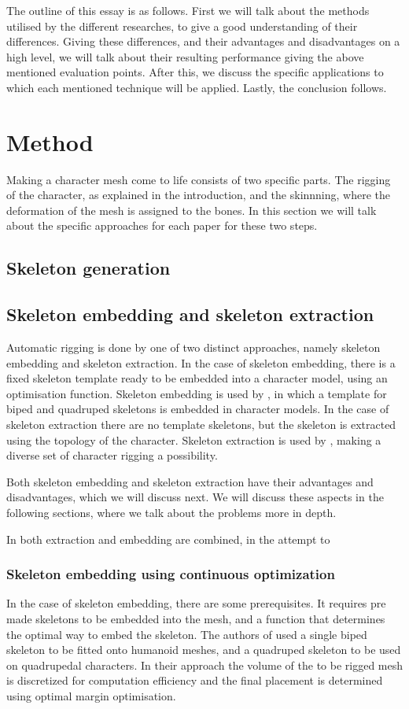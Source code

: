 \documentclass{article}
\begin{document}
The outline of this essay is as follows. First we will talk about the methods
utilised by the different researches, to give a good understanding of their
differences. Giving these differences, and their advantages and disadvantages on
a high level, we will talk about their resulting performance giving the above
mentioned evaluation points. After this, we discuss the specific applications to
which each mentioned technique will be applied. Lastly, the conclusion follows.

\section{Method}
Making a character mesh come to life consists of two specific parts. The rigging
of the character, as explained in the introduction, and the skinnning, where the
deformation of the mesh is assigned to the bones. In this section we will talk
about the specific approaches for each paper for these two steps.

\subsection{Skeleton generation}
    \subsection{Skeleton embedding and skeleton extraction}
Automatic rigging is done by one of two distinct approaches, namely skeleton
embedding and skeleton extraction. In the case of skeleton embedding, there
is a fixed skeleton template ready to be embedded into a character model,
using an optimisation function. Skeleton embedding is used by
\citep{paper1}, in which a template for biped and quadruped skeletons is
embedded in character     models. In the case of skeleton extraction there
are no template skeletons, but the skeleton is     extracted using the
topology of the character. Skeleton extraction is used by \citep{paper2},
making a diverse set of character rigging a possibility.

Both skeleton embedding and skeleton extraction have their advantages and
disadvantages, which     we will discuss next. We will discuss these aspects in
the following sections, where we talk     about the problems more in depth. 

In \citep{paper3} both extraction and embedding are combined, in the attempt to    

\subsubsection{Skeleton embedding using continuous optimization}
In the case of skeleton embedding, there are some prerequisites. It requires pre
made skeletons to be embedded into the mesh, and a function that determines the
optimal way to embed the skeleton. 
The authors of \citep{paper1} used a single biped skeleton to be fitted onto
humanoid meshes, and a quadruped skeleton to be used on quadrupedal characters.
In their approach the volume of the to be rigged mesh is discretized for
computation efficiency and the final placement is determined using optimal
margin optimisation.
 
\end{document}
